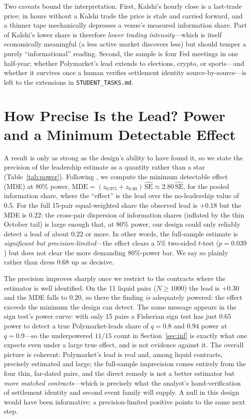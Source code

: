 \documentclass[12pt]{article}
\begin{document}
Two caveats bound the interpretation. First, Kalshi's hourly close is a last-trade price;
in hours without a Kalshi trade the price is stale and carried forward, and a thinner tape
mechanically depresses a venue's measured information share. Part of Kalshi's lower share is
therefore \emph{lower trading intensity}---which is itself economically meaningful (a less
active market discovers less) but should temper a purely ``informational'' reading. Second,
the sample is four Fed meetings in one half-year; whether Polymarket's lead extends to
elections, crypto, or sports---and whether it survives once a human verifies settlement
identity source-by-source---is left to the extensions in \texttt{STUDENT\_TASKS.md}.

\section{How Precise Is the Lead? Power and a Minimum Detectable Effect}\label{sec:power}
A result is only as strong as the design's ability to have found it, so we state the precision of
the leadership estimate as a quantity rather than a star (Table~\ref{tab:power}). Following
\citet{abadie2020}, we compute the minimum detectable effect (MDE) at 80\% power,
$\text{MDE}=(z_{0.975}+z_{0.80})\,\widehat{\text{SE}}\approx 2.80\,\widehat{\text{SE}}$, for the
pooled information share, where the ``effect'' is the lead over the no-leadership value of $0.5$.
For the full 15-pair equal-weighted share the observed lead is $+0.18$ but the MDE is $0.22$: the
cross-pair dispersion of information shares (inflated by the thin October tail) is large enough
that, at 80\% power, our design could only reliably detect a lead of about $0.22$ or more. In other
words, the full-sample estimate is \emph{significant but precision-limited}---the effect clears a
$5\%$ two-sided $t$-test ($p=0.039$) but does not clear the more demanding $80\%$-power bar. We say
so plainly rather than dress $0.68$ up as decisive.

The precision improves sharply once we restrict to the contracts where the estimator is well
identified. On the 11 liquid pairs ($N\ge1000$) the lead is $+0.30$ and the MDE falls to $0.20$, so
there the finding \emph{is} adequately powered: the effect exceeds the minimum the design can
detect. The same message appears in the sign test's power curve: with only 15 pairs a Fisherian
sign test has just $0.65$ power to detect a true Polymarket-leads share of $q=0.8$ and $0.94$ power
at $q=0.9$---so the underpowered $11/15$ count in Section~\ref{sec:inf} is exactly what one expects
even under a large true effect, and is not evidence against it. The overall picture is coherent:
Polymarket's lead is real and, among liquid contracts, precisely estimated and large; the
full-sample imprecision comes entirely from the four thin, far-dated pairs, and the direct remedy
is not a better estimator but \emph{more matched contracts}---which is precisely what the analyst's
hand-verification of settlement identity and second event family will supply. A null in this design
would have been informative; a precision-limited positive points to the same next step.
\end{document}
